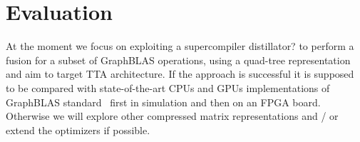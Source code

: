 \documentclass[sigplan,review,anonymous,nonacm]{acmart}\settopmatter{printfolios=true,printccs=false,printacmref=false}
\newcommand\question[1]{{\color{violet}#1}}
\begin{document}
\section{Evaluation}
At the moment we focus on exploiting a supercompiler \question{distillator?} to perform a fusion for a subset of GraphBLAS operations, using a quad-tree representation and aim to target TTA architecture. If the approach is successful it is supposed to be compared with state-of-the-art CPUs and GPUs implementations of GraphBLAS standard~\cite{SuiteSparse,yang2020graphblast}
first in simulation and then on an FPGA board. Otherwise we will explore other compressed matrix representations and / or extend the optimizers if possible.













\end{document}
